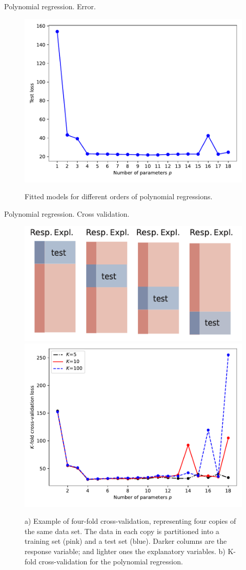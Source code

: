 \documentclass{beamer}
\begin{document}
\begin{frame}{Polynomial regression. Error.}
  \begin{figure}
    \includegraphics[width=0.7\linewidth]{MSEpy}
    \label{fig:MSEpy}
    \caption{Fitted models for different orders of polynomial regressions\cite{kroese2020}.}
  \end{figure}
\end{frame}

\begin{frame}{Polynomial regression. Cross validation.}
  \begin{figure}
    \includegraphics[width=0.4\linewidth]{crossval}
    \includegraphics[width=0.4\linewidth]{crossvalpy}
    \label{fig:crossvalpy}
    \caption{a) Example of four-fold cross-validation, representing four copies of the same data set. The data in each copy is partitioned into a training set (pink) and a test set (blue).  Darker columns are the response variable; and lighter ones the explanatory variables. b) K-fold cross-validation for the polynomial regression\cite{kroese2020}.}
  \end{figure}
\end{frame}
\end{document}
